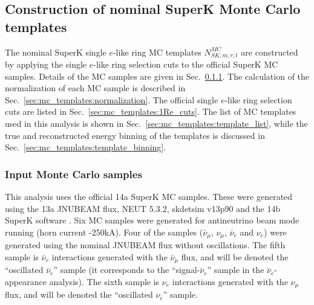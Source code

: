 
\subsection {Construction of nominal SuperK Monte Carlo templates}
\label{sec:mc_templates}

The nominal SuperK single $e$-like ring MC templates $N_{SK;m;r;t}^{MC}$
are constructed by applying the single $e$-like ring selection cuts to the official SuperK MC samples.
Details of the MC samples are given in Sec.~\ref{sec:mc_templates:input_mc}.
The calculation of the normalization of each MC sample is described in Sec.~\ref{sec:mc_templates:normalization}.
The official single $e$-like ring selection cuts are listed in Sec.~\ref{sec:mc_templates:1Re_cuts}.
The list of MC templates used in this analysis is shown in Sec.~\ref{sec:mc_templates:template_list},
while the true and reconstructed energy binning of the templates is discussed 
in Sec.~\ref{sec:mc_templates:template_binning}.

\subsubsection {Input Monte Carlo samples}
\label{sec:mc_templates:input_mc}


This analysis uses the official 14a SuperK MC samples. These were generated using the 13a JNUBEAM flux, NEUT 5.3.2, 
skdetsim v13p90 and the 14b SuperK software \cite{SuperkMC14a}. Six MC samples were generated for antineutrino beam 
mode running (horn current -250kA). Four of the samples ($\bar{\nu}_{\mu}$, $\nu_{\mu}$, $\bar{\nu}_{e}$ and $\nu_{e}$) 
were generated using the nominal JNUBEAM flux without oscillations.
The fifth sample is $\bar{\nu}_{e}$ interactions generated with the $\bar{\nu}_{\mu}$ flux, and will be denoted the 
``oscillated $\bar{\nu}_{e}$'' sample (it corresponds to the ``signal-$\bar{\nu}_{e}$'' sample in the 
$\bar{\nu}_{e}$-appearance analysis). The sixth sample is $\nu_{e}$ interactions generated with the $\nu_{\mu}$ flux, 
and will be denoted the ``oscillated $\nu_{e}$'' sample.

